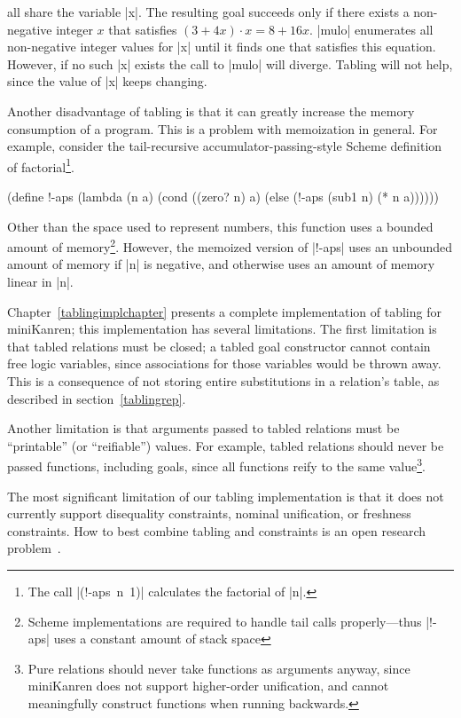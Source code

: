 \wspace

\noindent
all share the variable \scheme|x|.
The resulting goal succeeds only if there exists a non-negative
integer $x$ that satisfies $(3 + 4x) \cdot x = 8 + 16x$.  \scheme|mulo| 
enumerates all non-negative integer values for \scheme|x| until it
finds one that satisfies this equation.  However, if no such
\scheme|x| exists the call to \scheme|mulo| will diverge.  Tabling
will not help, since the value of \scheme|x| keeps changing.

Another disadvantage of tabling is that it can greatly increase the
memory consumption of a program.  This is a problem with memoization
in general.  For example, consider the tail-recursive
accumulator-passing-style Scheme definition of factorial\footnote{The
  call \mbox{\scheme|(!-aps n 1)|} calculates the factorial of
  \scheme|n|.}.

\schemedisplayspace
\begin{schemedisplay}
(define !-aps
  (lambda (n a)
    (cond
      ((zero? n) a)
      (else (!-aps (sub1 n) (* n a))))))
\end{schemedisplay}

\noindent Other than the space used to represent numbers, this
function uses a bounded amount of memory\footnote{Scheme
  implementations are required to handle tail calls properly---thus
  \scheme|!-aps| uses a constant amount of stack space}.  However, the
memoized version of \scheme|!-aps| uses an unbounded amount of memory
if \scheme|n| is negative, and otherwise uses an amount of memory
linear in \scheme|n|.

Chapter~\ref{tablingimplchapter} presents a complete implementation of
tabling for miniKanren; this implementation has several limitations.
The first limitation is that tabled relations must be closed; a tabled
goal constructor cannot contain free logic variables, since
associations for those variables would be thrown away.  This is a
consequence of not storing entire substitutions in a relation's table,
as described in section~\ref{tablingrep}.

Another limitation is that arguments passed to tabled relations must
be ``printable'' (or ``reifiable'') values.  For example, tabled
relations should never be passed functions, including goals, since all
functions reify to the same value\footnote{Pure relations should never
take functions as arguments anyway, since miniKanren does not support
higher-order unification, and cannot meaningfully construct functions
when running backwards.}.

The most significant limitation of our tabling implementation is that
it does not currently support disequality constraints, nominal
unification, or freshness constraints.  How to best combine tabling
and constraints is an open research problem~\cite{TCHR08}.
